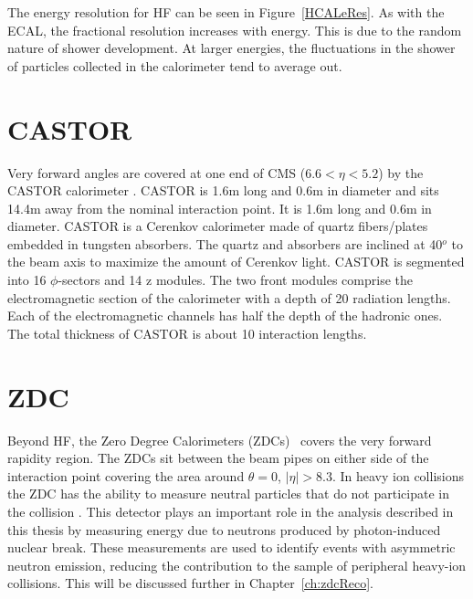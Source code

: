     The energy resolution for HF can be seen in Figure~\ref{HCALeRes}.  
    As with the ECAL, the fractional resolution increases with energy. 
    This is due to the random nature of shower development. 
    At larger energies, the fluctuations in the shower of particles collected 
      in the calorimeter tend to average out.
   
  \section{CASTOR}
   Very forward angles are covered at one end of CMS ($6.6 < \eta < 5.2$) by 
     the CASTOR calorimeter \cite{Andreev:2010zzb}.
   CASTOR is 1.6m long and 0.6m in diameter and sits 14.4m away from the nominal
     interaction point. It is 1.6m long and 0.6m in diameter. 
   CASTOR is a Cerenkov calorimeter made of quartz fibers/plates embedded in 
     tungsten absorbers.
   The quartz and absorbers are inclined at 40$^o$ to the beam axis to maximize
     the amount of Cerenkov light. 
   CASTOR is segmented into 16 $\phi$-sectors and 14 z modules.
   The two front modules comprise the electromagnetic section of the calorimeter
     with a depth of 20 radiation lengths. 
   Each of the electromagnetic channels has half the depth of the hadronic ones. 
   The total thickness  of CASTOR is about 10 interaction lengths. 

  \section{ZDC \label{sec:zdcDet}} 
    Beyond HF, the Zero Degree Calorimeters (ZDCs)~\cite{Grachov:2006ke} covers the very forward 
      rapidity region.
    The ZDCs sit between the beam pipes on either side of the interaction point 
      covering the area around $\theta = 0$, $|\eta| > 8.3$.
    In heavy ion collisions the ZDC has the ability to measure neutral particles 
    	that do not participate in the collision \cite{tCmsE}.
    This detector plays an important role in the analysis described in this
      thesis by measuring energy due to neutrons produced by photon-induced 
      nuclear break.
    These measurements are used to identify events with asymmetric neutron 
      emission, reducing the contribution to the sample of peripheral heavy-ion 
      collisions.
    This will be discussed further in Chapter~\ref{ch:zdcReco}.

